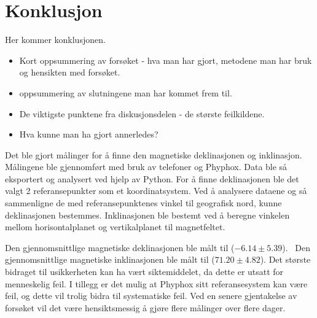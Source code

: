 \section{Konklusjon}
Her kommer konklusjonen.

\begin{itemize}
    \item Kort oppsummering av forsøket - hva man har gjort, metodene man har bruk og hensikten med forsøket. 
    \item oppsummering av slutningene man har kommet frem til.
    \item De viktigste punktene fra diskusjonsdelen - de største feilkildene. 
    \item Hva kunne man ha gjort annerledes?
\end{itemize}

Det ble gjort målinger for å finne den magnetiske deklinasjonen og inklinasjon. Målingene ble gjennomført med bruk av telefoner og Phyphox. Data ble så eksportert og analysert ved hjelp av Python. For å finne deklinasjonen ble det valgt 2 referansepunkter som et koordinatsystem. Ved å analysere dataene og så sammenligne de med referansepunktenes vinkel til geografisk nord, kunne deklinasjonen bestemmes. Inklinasjonen ble bestemt ved å beregne vinkelen mellom horisontalplanet og vertikalplanet til magnetfeltet. 

Den gjennomsnittlige magnetiske deklinasjonen ble målt til ($-6.14 \pm 5.39$)\textdegree. \ Den gjennomsnittlige magnetiske inklinasjonen ble målt til ($71.20 \pm 4.82$)\textdegree. Det største bidraget til usikkerheten kan ha vært siktemiddelet, da dette er utsatt for menneskelig feil. I tillegg er det mulig at Phyphox sitt referansesystem kan være feil, og dette vil trolig bidra til systematiske feil. Ved en senere gjentakelse av forsøket vil det være hensiktsmessig å gjøre flere målinger over flere dager.     
